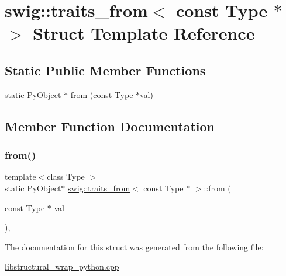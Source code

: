 \hypertarget{structswig_1_1traits__from_3_01const_01_type_01_5_01_4}{}\section{swig\+:\+:traits\+\_\+from$<$ const Type $\ast$ $>$ Struct Template Reference}
\label{structswig_1_1traits__from_3_01const_01_type_01_5_01_4}
\subsection*{Static Public Member Functions}
\begin{DoxyCompactItemize}
\item 
static Py\+Object $\ast$ \hyperlink{structswig_1_1traits__from_3_01const_01_type_01_5_01_4_ae36dbdb3c905af0dab508e7bf360a8d6}{from} (const Type $\ast$val)
\end{DoxyCompactItemize}


\subsection{Member Function Documentation}
\mbox{\label{structswig_1_1traits__from_3_01const_01_type_01_5_01_4_ae36dbdb3c905af0dab508e7bf360a8d6}} 
\subsubsection{\texorpdfstring{from()}{from()}}
{\footnotesize\ttfamily template$<$class Type $>$ \\
static Py\+Object$\ast$ \hyperlink{structswig_1_1traits__from}{swig\+::traits\+\_\+from}$<$ const Type $\ast$ $>$\+::from (\begin{DoxyParamCaption}\item[{const Type $\ast$}]{val }\end{DoxyParamCaption})\hspace{0.3cm}{\ttfamily [inline]}, {\ttfamily [static]}}



The documentation for this struct was generated from the following file\+:\begin{DoxyCompactItemize}
\item 
\hyperlink{libstructural__wrap__python_8cpp}{libstructural\+\_\+wrap\+\_\+python.\+cpp}\end{DoxyCompactItemize}
